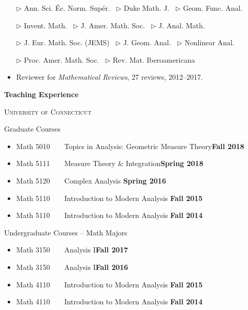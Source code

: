 \documentclass[12pt]{amsart}
\newcommand{\ssection}[1]{\noindent\textbf{#1}\vspace{.2cm}}
\newcommand{\esection}{\vspace{.3cm}}
\begin{document}
\begin{itemize}
 $\rhd$ Ann. Sci. \'Ec. Norm. Sup\'er. \ $\rhd$ Duke Math. J. \ $\rhd$ Geom. Func. Anal.

 $\rhd$ Invent. Math. \ $\rhd$ J. Amer. Math. Soc. \ $\rhd$ J. Anal. Math.

  $\rhd$ J. Eur. Math. Soc. (JEMS) \ $\rhd$ J. Geom. Anal. \  $\rhd$ Nonlinear Anal.

  $\rhd$ Proc. Amer. Math. Soc. \ $\rhd$ Rev. Mat. Iberoamericana
\item Reviewer for \emph{Mathematical Reviews}, 27 reviews, 2012--2017.
\end{itemize}

\esection

\ssection{Teaching Experience}

\noindent \textsc{University of Connecticut}\vspace{.1cm}

\textsf{Graduate Courses}
\begin{itemize}
\item Math 5010\ \ \ \ Topics in Analysis: Geometric Measure Theory\hfill\textbf{Fall 2018}
\item Math 5111\ \ \ \ Measure Theory \& Integration\hfill \textbf{Spring 2018}
\item Math 5120\ \ \ \ Complex Analysis \hfill \textbf{Spring 2016}
\item Math 5110\ \ \ \ Introduction to Modern Analysis \hfill \textbf{Fall 2015}
\item Math 5110\ \ \ \ Introduction to Modern Analysis \hfill\textbf{Fall 2014}

\end{itemize} \vspace{.1cm}


\textsf{Undergraduate Courses -- Math Majors}
\begin{itemize}

\item Math 3150\ \ \ \ Analysis I\hfill\textbf{Fall 2017}

\item Math 3150\ \ \ \ Analysis I\hfill\textbf{Fall 2016}

\item Math 4110\ \ \ \ Introduction to Modern Analysis \hfill\textbf{Fall 2015}

\item Math 4110\ \ \ \ Introduction to Modern Analysis \hfill\textbf{Fall 2014}

\end{itemize} \vspace{.1cm}
\end{document}
